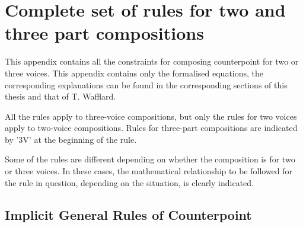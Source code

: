 \chapter{Complete set of rules for two and three part compositions}\label{appendix:complete-set-of-rule}
This appendix contains all the constraints for composing counterpoint for two or three voices. This appendix contains only the formalised equations, the corresponding explanations can be found in the corresponding sections of this thesis and that of T. Wafflard.

All the rules apply to three-voice compositions, but only the rules for two voices apply to two-voice compositions. Rules for three-part compositions are indicated by '3V' at the beginning of the rule.


Some of the rules are different depending on whether the composition is for two or three voices. In these cases, the mathematical relationship to be followed for the rule in question, depending on the situation, is clearly indicated.

\section*{Implicit General Rules of Counterpoint}


